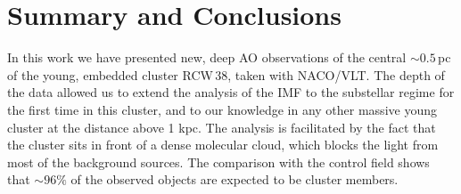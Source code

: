\documentclass[a4paper,fleqn,usenatbib]{mnras}
\begin{document}



\section{Summary and Conclusions}
\label{summary}

In this work we have presented new, deep AO observations of the central $\sim 0.5\,$pc
of the young, embedded cluster RCW\,38, taken with NACO/VLT. The depth of the data allowed us to
extend the analysis of the IMF to the substellar regime for the first time in this cluster, and to our knowledge
in any other massive young cluster at the distance above 1 kpc. The analysis is facilitated by the fact that the
cluster sits in front of a dense molecular cloud, which blocks the light from most of the background sources. The comparison 
with the control field shows that $\sim96\%$ of the observed objects are expected to be cluster members.
\end{document}
